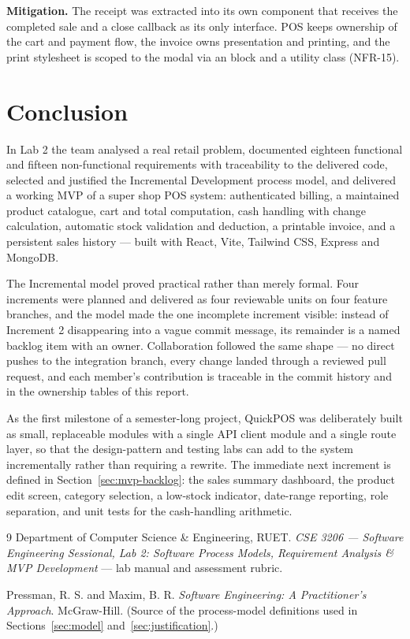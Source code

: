 \documentclass[11pt,a4paper]{article}
\newcommand{\code}[1]{\texttt{\small\color{codefg}\detokenize{#1}}}
\newcommand{\filep}[1]{\texttt{\small\color{navy}\detokenize{#1}}}
\begin{document}
\textbf{Mitigation.} The receipt was extracted into its own \filep{Invoice.jsx} component
that receives the completed sale and a close callback as its only interface. POS keeps
ownership of the cart and payment flow, the invoice owns presentation and printing, and the
print stylesheet is scoped to the modal via an \code{@media print} block and a
\code{no-print} utility class (NFR-15).

\section{Conclusion}

In Lab 2 the team analysed a real retail problem, documented eighteen functional and fifteen
non-functional requirements with traceability to the delivered code, selected and justified
the Incremental Development process model, and delivered a working MVP of a super shop POS
system: authenticated billing, a maintained product catalogue, cart and total computation,
cash handling with change calculation, automatic stock validation and deduction, a printable
invoice, and a persistent sales history --- built with React, Vite, Tailwind CSS, Express and
MongoDB.

The Incremental model proved practical rather than merely formal. Four increments were
planned and delivered as four reviewable units on four feature branches, and the model made
the one incomplete increment visible: instead of Increment 2 disappearing into a vague commit
message, its remainder is a named backlog item with an owner. Collaboration followed the same
shape --- no direct pushes to the integration branch, every change landed through a reviewed
pull request, and each member's contribution is traceable in the commit history and in the
ownership tables of this report.

As the first milestone of a semester-long project, QuickPOS was deliberately built as small,
replaceable modules with a single API client module and a single route layer, so that the
design-pattern and testing labs can add to the system incrementally rather than requiring a
rewrite. The immediate next increment is defined in Section~\ref{sec:mvp-backlog}: the sales
summary dashboard, the product edit screen, category selection, a low-stock indicator,
date-range reporting, role separation, and unit tests for the cash-handling arithmetic.

\begin{thebibliography}{9}
\small
{} Department of Computer Science \& Engineering, RUET.
  \emph{CSE 3206 --- Software Engineering Sessional, Lab 2: Software Process Models,
  Requirement Analysis \& MVP Development} --- lab manual and assessment rubric.

 Pressman, R. S. and Maxim, B. R.
  \emph{Software Engineering: A Practitioner's Approach}. McGraw-Hill.
  (Source of the process-model definitions used in Sections~\ref{sec:model}
  and~\ref{sec:justification}.)
\end{thebibliography}
\end{document}
